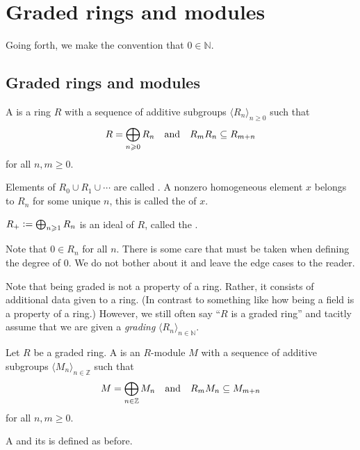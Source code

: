 \documentclass[12pt]{article}
\begin{document}
\section{Graded rings and modules}

Going forth, we make the convention that $0 \in \mathbb{N}$.

\subsection{Graded rings and modules}

\begin{defn}
	A  is a ring $R$ with a sequence of additive subgroups $\langle R_{n} \rangle_{n \ge 0}$ such that
	\begin{equation*} 
		R = \bigoplus_{n \ge 0} R_{n} \andd R_{m} R_{n} \subset R_{m + n}
	\end{equation*}
	for all $n, m \ge 0$.

	Elements of $R_{0} \cup R_{1} \cup \cdots$ are called . A nonzero homogeneous element $x$ belongs to $R_{n}$ for some unique $n$, this is called the  of $x$.

	$R_{+} \vcentcolon= \bigoplus_{n \ge 1} R_{n}$ is an ideal of $R$, called the .
\end{defn}

Note that $0 \in R_{n}$ for all $n$. There is some care that must be taken when defining the degree of $0$. We do not bother about it and leave the edge cases to the reader.

Note that being graded is not a property of a ring. Rather, it consists of additional data given to a ring. (In contrast to something like how being a field is a property of a ring.) \newline
However, we still often say ``$R$ is a graded ring'' and tacitly assume that we are given a \emph{grading} $\langle R_{n} \rangle_{n \in \mathbb{N}}$.

\begin{defn}
	Let $R$ be a graded ring. A  is an $R$-module $M$ with a sequence of additive subgroups $\langle M_{n} \rangle_{n \in \mathbb{Z}}$ such that
	\begin{equation*} 
		M = \bigoplus_{n \in \mathbb{Z}} M_{n} \andd R_{m} M_{n} \subset M_{m + n}
	\end{equation*}
	for all $n, m \ge 0$.

	A  and its  is defined as before.
\end{defn}
\end{document}
